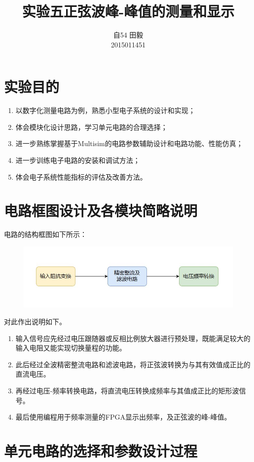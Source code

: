 \documentclass[12pt,a4paper]{article}
\title{实验五\quad 正弦波峰-峰值的测量和显示}
\author{自54 田毅\\ 2015011451}
\begin{document}
\begin{spacing}{1.3}
\maketitle
\tableofcontents
\newpage
\section{实验目的}
\begin{enumerate}
\item 以数字化测量电路为例，熟悉小型电子系统的设计和实现；
\item 体会模块化设计思路，学习单元电路的合理选择；
\item 进一步熟练掌握基于Multisim的电路参数辅助设计和电路功能、性能仿真；
\item 进一步训练电子电路的安装和调试方法；
\item 体会电子系统性能指标的评估及改善方法。
\end{enumerate}
\section{电路框图设计及各模块简略说明}
电路的结构框图如下所示：
\begin{figure}[H]
\centering
\includegraphics[width=\textwidth]{0.jpg}
\end{figure}
对此作出说明如下。
\begin{enumerate}
\item 输入信号应先经过电压跟随器或反相比例放大器进行预处理，既能满足较大的输入电阻又能实现切换量程的功能。
\item 此后经过全波精密整流电路和滤波电路，将正弦波转换为与其有效值成正比的直流电压。
\item 再经过电压-频率转换电路，将直流电压转换成频率与其值成正比的矩形波信号。
\item 最后使用编程用于频率测量的FPGA显示出频率，及正弦波的峰-峰值。
\end{enumerate}
\section{单元电路的选择和参数设计过程}

\end{spacing}
\end{document}
